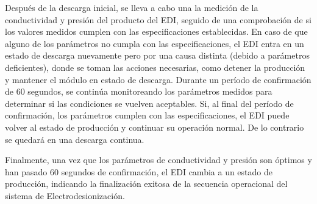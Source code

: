 Después de la descarga inicial, se lleva a cabo una la medición de la conductividad y presión del producto
del EDI, seguido de una comprobación de si los valores medidos cumplen con las especificaciones establecidas.
En caso de que alguno de los parámetros no cumpla con las especificaciones, el EDI entra en un estado de
descarga nuevamente pero por una causa distinta (debido a parámetros deficientes), donde se toman las acciones necesarias, como detener la producción
y mantener el módulo en estado de descarga. Durante un período de confirmación de 60 segundos, se continúa
monitoreando los parámetros medidos para determinar si las condiciones se vuelven aceptables. Si, al
final del período de confirmación, los parámetros cumplen con las especificaciones, el EDI puede volver
al estado de producción y continuar su operación normal. De lo contrario se quedará en una descarga continua.

Finalmente, una vez que los parámetros de conductividad y presión son óptimos y han pasado 60 segundos
de confirmación, el EDI cambia a un estado de producción, indicando la finalización exitosa de la
secuencia operacional del sistema de Electrodesionización.





